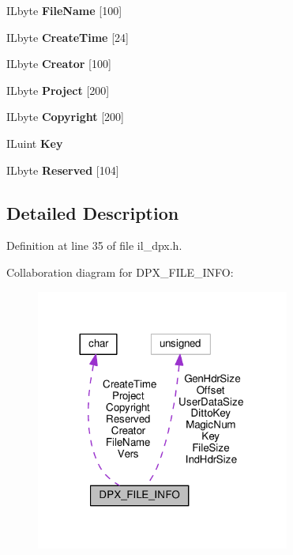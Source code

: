 \begin{DoxyCompactItemize}
I\+Lbyte {\bfseries File\+Name} \mbox{[}100\mbox{]}
\item 
\mbox{\label{structDPX__FILE__INFO_a8556ec807838d28d2ff8f2d619f83e77}} 
I\+Lbyte {\bfseries Create\+Time} \mbox{[}24\mbox{]}
\item 
\mbox{\label{structDPX__FILE__INFO_a1920cbb2b4ceecf736114efb5e7d7b19}} 
I\+Lbyte {\bfseries Creator} \mbox{[}100\mbox{]}
\item 
\mbox{\label{structDPX__FILE__INFO_a903ee378613d7dc297387a2fa8c24c16}} 
I\+Lbyte {\bfseries Project} \mbox{[}200\mbox{]}
\item 
\mbox{\label{structDPX__FILE__INFO_a0bc96ae705b88e24660e5fae1e78212a}} 
I\+Lbyte {\bfseries Copyright} \mbox{[}200\mbox{]}
\item 
\mbox{\label{structDPX__FILE__INFO_a4a4714079c7ac0132424b5b08c125edb}} 
I\+Luint {\bfseries Key}
\item 
\mbox{\label{structDPX__FILE__INFO_a653b3c3b169fc26c1b8a56746b6ecfde}} 
I\+Lbyte {\bfseries Reserved} \mbox{[}104\mbox{]}
\end{DoxyCompactItemize}


\subsection{Detailed Description}


Definition at line 35 of file il\+\_\+dpx.\+h.



Collaboration diagram for D\+P\+X\+\_\+\+F\+I\+L\+E\+\_\+\+I\+N\+FO\+:
\nopagebreak
\begin{figure}[H]
\begin{center}
\leavevmode
\includegraphics[width=236pt]{d0/dfc/structDPX__FILE__INFO__coll__graph}
\end{center}
\end{figure}


